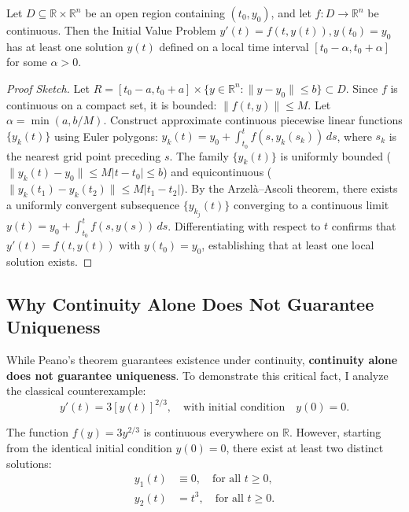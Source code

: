 \documentclass[runningheads]{llncs}
\begin{document}
\begin{theorem}
\label{thm:peano}
Let $D \subseteq \mathbb{R} \times \mathbb{R}^n$ be an open region containing $(t_0, y_0)$, and let $f : D \to \mathbb{R}^n$ be continuous. Then the Initial Value Problem $y'(t) = f(t, y(t)), y(t_0) = y_0$ has at least one solution $y(t)$ defined on a local time interval $[t_0 - \alpha, t_0 + \alpha]$ for some $\alpha > 0$.
\end{theorem}

\begin{proof}[Proof Sketch]
Let $R = [t_0 - a, t_0 + a] \times \{y \in \mathbb{R}^n : \|y - y_0\| \le b\} \subset D$. Since $f$ is continuous on a compact set, it is bounded: $\|f(t, y)\| \le M$. Let $\alpha = \min(a, b/M)$. Construct approximate continuous piecewise linear functions $\{y_k(t)\}$ using Euler polygons: $y_k(t) = y_0 + \int_{t_0}^t f(s, y_k(s_k)) \, ds$, where $s_k$ is the nearest grid point preceding $s$. The family $\{y_k(t)\}$ is uniformly bounded ($\|y_k(t) - y_0\| \le M|t - t_0| \le b$) and equicontinuous ($\|y_k(t_1) - y_k(t_2)\| \le M|t_1 - t_2|$). By the Arzel\`a--Ascoli theorem, there exists a uniformly convergent subsequence $\{y_{k_j}(t)\}$ converging to a continuous limit $y(t) = y_0 + \int_{t_0}^t f(s, y(s)) \, ds$. Differentiating with respect to $t$ confirms that $y'(t) = f(t, y(t))$ with $y(t_0) = y_0$, establishing that at least one local solution exists.
\end{proof}

\subsection{Why Continuity Alone Does Not Guarantee Uniqueness}
While Peano's theorem guarantees existence under continuity, \textbf{continuity alone does not guarantee uniqueness}. To demonstrate this critical fact, I analyze the classical counterexample:
\begin{equation}
\label{eq:counterexample}
y'(t) = 3 [y(t)]^{2/3}, \quad \text{with initial condition} \quad y(0) = 0.
\end{equation}

The function $f(y) = 3 y^{2/3}$ is continuous everywhere on $\mathbb{R}$. However, starting from the identical initial condition $y(0) = 0$, there exist at least two distinct solutions:
\begin{align}
y_1(t) &\equiv 0, \quad \text{for all } t \ge 0, \label{eq:sol1} \\
y_2(t) &= t^3, \quad \text{for all } t \ge 0. \label{eq:sol2}
\end{align}
\end{document}
